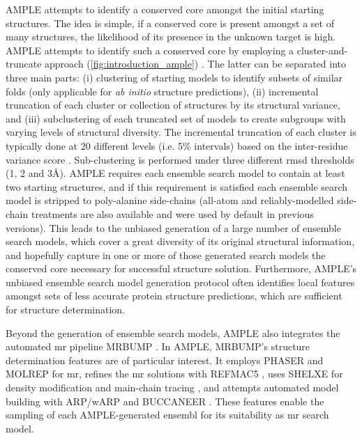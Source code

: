 AMPLE attempts to identify a conserved core amongst the initial starting structures. The idea is simple, if a conserved core is present amongst a set of many structures, the likelihood of its presence in the unknown target is high. AMPLE attempts to identify such a conserved core by employing a cluster-and-truncate approach (\cref{fig:introduction_ample}) \cite{Bibby2012-lm}. The latter can be separated into three main parts: (i) clustering of starting models to identify subsets of similar folds (only applicable for \textit{ab initio} structure predictions), (ii) incremental truncation of each cluster or collection of structures by its structural variance, and (iii) subclustering of each truncated set of models to create subgroups with varying levels of structural diversity. The incremental truncation of each cluster is typically done at 20 different levels (i.e. 5\% intervals) based on the inter-residue variance score \cite{Theobald2006-qj}. Sub-clustering is performed under three different \gls{rmsd} thresholds (1, 2 and 3\AA). AMPLE requires each ensemble search model to contain at least two starting structures, and if this requirement is satisfied each ensemble search model is stripped to poly-alanine side-chains (all-atom and reliably-modelled side-chain \cite{Krivov2009-ex} treatments are also available and were used by default in previous versions). This leads to the unbiased generation of a large number of ensemble search models, which cover a great diversity of its original structural information, and hopefully capture in one or more of those generated search models the conserved core necessary for successful structure solution. Furthermore, AMPLE's unbiased ensemble search model generation protocol often identifies local features amongst sets of less accurate  protein structure predictions, which are sufficient for structure determination. 

Beyond the generation of ensemble search models, AMPLE also integrates the automated \gls{mr} pipeline MRBUMP \cite{Keegan2018-kn}. In AMPLE, MRBUMP's structure determination features are of particular interest. It employs PHASER \cite{McCoy2007-mp} and MOLREP \cite{Vagin2010-ux} for \gls{mr}, refines the \gls{mr} solutions with REFMAC5 \cite{Murshudov2011-ww}, uses SHELXE for density modification and main-chain tracing \cite{Thorn2013-le}, and attempts automated model building with ARP/wARP \cite{Cohen2007-wg} and BUCCANEER \cite{Cowtan2006-xv}. These features enable the sampling of each AMPLE-generated ensembl for its suitability as \gls{mr} search model.

